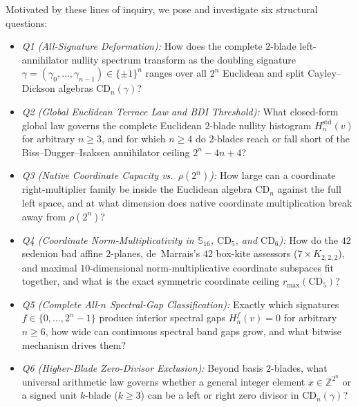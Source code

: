 \documentclass[11pt,reqno]{amsart}
\theoremstyle{plain}
\theoremstyle{definition}
\theoremstyle{remark}
\newcommand{\CD}{\mathrm{CD}}
\newcommand{\SSed}{\mathbb{S}_{16}}
\newcommand{\Z}{\mathbb{Z}}
\newcommand{\std}{\mathrm{std}}
\begin{document}
Motivated by these lines of inquiry, we pose and investigate six structural questions:
\begin{itemize}[leftmargin=2em]
  \item \emph{Q1 (All-Signature Deformation):} How does the complete $2$-blade left-annihilator
    nullity spectrum transform as the doubling signature
    $\gamma = (\gamma_0, \dots, \gamma_{n-1}) \in \{\pm 1\}^n$ ranges over all $2^n$ Euclidean
    and split Cayley--Dickson algebras $\CD_n(\gamma)$?
  \item \emph{Q2 (Global Euclidean Terrace Law and BDI Threshold):} What closed-form global law
    governs the complete Euclidean $2$-blade nullity histogram $H_n^{\std}(v)$ for arbitrary
    $n \ge 3$, and for which $n \ge 4$ do $2$-blades reach or fall short of the
    Biss--Dugger--Isaksen annihilator ceiling $2^n - 4n + 4$?
  \item \emph{Q3 (Native Coordinate Capacity vs.\ $\rho(2^n)$):} How large can a coordinate
    right-multiplier family be inside the Euclidean algebra $\CD_n$ against the full left space,
    and at what dimension does native coordinate multiplication break away from $\rho(2^n)$?
  \item \emph{Q4 (Coordinate Norm-Multiplicativity in $\SSed$, $\CD_5$, and $\CD_6$):} How do the
    $42$ sedenion bad affine $2$-planes, de~Marrais's $42$ box-kite assessors ($7 \times K_{2,2,2}$),
    and maximal $10$-dimensional norm-multiplicative coordinate subspaces fit together, and what
    is the exact symmetric coordinate ceiling $r_{\max}(\CD_5)$?
  \item \emph{Q5 (Complete All-$n$ Spectral-Gap Classification):} Exactly which signatures
    $f \in \{0, \dots, 2^n - 1\}$ produce interior spectral gaps $H_n^f(v) = 0$ for arbitrary
    $n \ge 6$, how wide can continuous spectral band gaps grow, and what bitwise mechanism drives
    them?
  \item \emph{Q6 (Higher-Blade Zero-Divisor Exclusion):} Beyond basis $2$-blades, what universal
    arithmetic law governs whether a general integer element $x \in \Z^{2^n}$ or a signed unit
    $k$-blade ($k \ge 3$) can be a left or right zero divisor in $\CD_n(\gamma)$?
\end{itemize}
\end{document}
